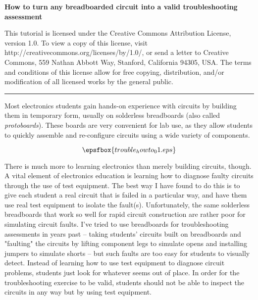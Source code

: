 






\centerline{\bf How to turn any breadboarded circuit into a valid troubleshooting assessment} \bigskip 
 
This tutorial is licensed under the Creative Commons Attribution License, version 1.0.  To view a copy of this license, visit http://creativecommons.org/licenses/by/1.0/, or send a letter to Creative Commons, 559 Nathan Abbott Way, Stanford, California 94305, USA.  The terms and conditions of this license allow for free copying, distribution, and/or modification of all licensed works by the general public.

\bigskip 

\hrule

\vskip 10pt

Most electronics students gain hands-on experience with circuits by building them in temporary form, usually on solderless breadboards (also called {\it protoboards}).  These boards are very convenient for lab use, as they allow students to quickly assemble and re-configure circuits using a wide variety of components. 

$$\epsfbox{trouble_howto_01.eps}$$

There is much more to learning electronics than merely building circuits, though.  A vital element of electronics education is learning how to diagnose faulty circuits through the use of test equipment.  The best way I have found to do this is to give each student a real circuit that is failed in a particular way, and have them use real test equipment to isolate the fault(s).  Unfortunately, the same solderless breadboards that work so well for rapid circuit construction are rather poor for simulating circuit faults.  I've tried to use breadboards for troubleshooting assessments in years past -- taking students' circuits built on breadboards and "faulting" the circuits by lifting component legs to simulate opens and installing jumpers to simulate shorts -- but such faults are too easy for students to visually detect.  Instead of learning how to use test equipment to diagnose circuit problems, students just look for whatever seems out of place.  In order for the troubleshooting exercise to be valid, students should not be able to inspect the circuits in any way but by using test equipment.

